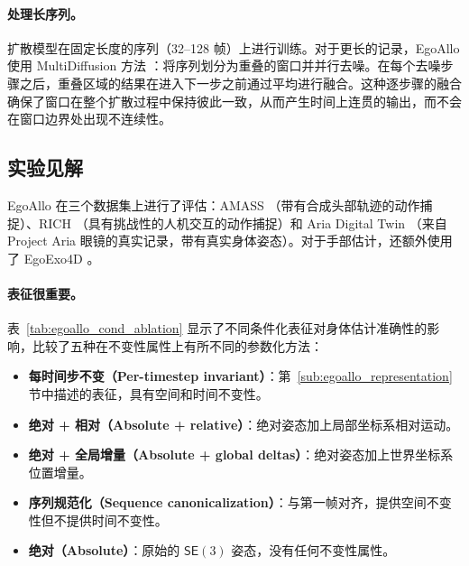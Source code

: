 \documentclass[../../book-main_zh.tex]{subfiles}
\begin{document}
\paragraph{处理长序列。}
扩散模型在固定长度的序列（32--128 帧）上进行训练。对于更长的记录，EgoAllo 使用 MultiDiffusion 方法 \citep{bar2023multidiffusion}：将序列划分为重叠的窗口并并行去噪。在每个去噪步骤之后，重叠区域的结果在进入下一步之前通过平均进行融合。这种逐步骤的融合确保了窗口在整个扩散过程中保持彼此一致，从而产生时间上连贯的输出，而不会在窗口边界处出现不连续性。

\subsection{实验见解}
\label{sub:egoallo_experiments}

EgoAllo 在三个数据集上进行了评估：AMASS
\citep{mahmood2019amass}（带有合成头部轨迹的动作捕捉）、RICH \citep{huang2022rich}（具有挑战性的人机交互的动作捕捉）和 Aria Digital Twin
\citep{pan2023aria}（来自 Project Aria 眼镜的真实记录，带有真实身体姿态）。对于手部估计，还额外使用了 EgoExo4D
\citep{grauman2023egoexo4d}。

\paragraph{表征很重要。}
表~\ref{tab:egoallo_cond_ablation} 显示了不同条件化表征对身体估计准确性的影响，比较了五种在不变性属性上有所不同的参数化方法：
\begin{itemize}
    \item \textbf{每时间步不变（Per-timestep invariant）}：第~\ref{sub:egoallo_representation} 节中描述的表征，具有空间和时间不变性。
    \item \textbf{绝对 + 相对（Absolute + relative）}：绝对姿态加上局部坐标系相对运动。
    \item \textbf{绝对 + 全局增量（Absolute + global deltas）}：绝对姿态加上世界坐标系位置增量。
    \item \textbf{序列规范化（Sequence canonicalization）}：与第一帧对齐，提供空间不变性但不提供时间不变性。
    \item \textbf{绝对（Absolute）}：原始的 $\mathsf{SE}(3)$ 姿态，没有任何不变性属性。
\end{itemize}
\end{document}
